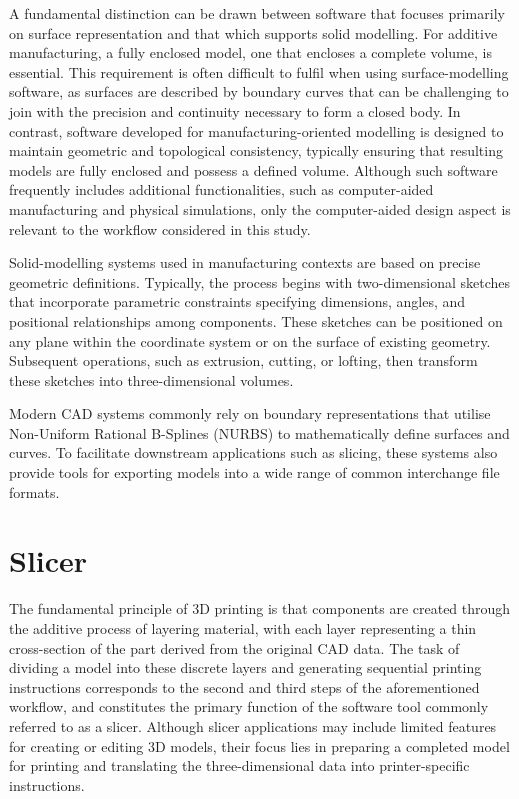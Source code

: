A fundamental distinction can be drawn between software that focuses primarily on surface representation and that which supports solid modelling.
For additive manufacturing, a fully enclosed model, \ie one that encloses a complete volume, is essential.
This requirement is often difficult to fulfil when using surface-modelling software, as surfaces are described by boundary curves that can be challenging to join with the precision and continuity necessary to form a closed body.
In contrast, software developed for manufacturing-oriented modelling is designed to maintain geometric and topological consistency, typically ensuring that resulting models are fully enclosed and possess a defined volume.\cite[p.~21]{gibson_additive_2010}
Although such software frequently includes additional functionalities, such as computer-aided manufacturing and physical simulations, only the computer-aided design aspect is relevant to the workflow considered in this study.

Solid-modelling systems used in manufacturing contexts are based on precise geometric definitions.
Typically, the process begins with two-dimensional sketches that incorporate parametric constraints specifying dimensions, angles, and positional relationships among components.
These sketches can be positioned on any plane within the coordinate system or on the surface of existing geometry.
Subsequent operations, such as extrusion, cutting, or lofting, then transform these sketches into three-dimensional volumes.

Modern CAD systems commonly rely on boundary representations that utilise Non-Uniform Rational B-Splines (NURBS) to mathematically define surfaces and curves.\cite[p.~21]{gibson_additive_2010}
To facilitate downstream applications such as slicing, these systems also provide tools for exporting models into a wide range of common interchange file formats.


\section{Slicer}

The fundamental principle of 3D printing is that components are created through the additive process of layering material, with each layer representing a thin cross-section of the part derived from the original CAD data.\cite[p.~2]{gibson_additive_2010}
The task of dividing a model into these discrete layers and generating sequential printing instructions corresponds to the second and third steps of the aforementioned workflow, and constitutes the primary function of the software tool commonly referred to as a slicer.
Although slicer applications may include limited features for creating or editing 3D models, their focus lies in preparing a completed model for printing and translating the three-dimensional data into printer-specific instructions.\cite{hudson_understanding_2016}

